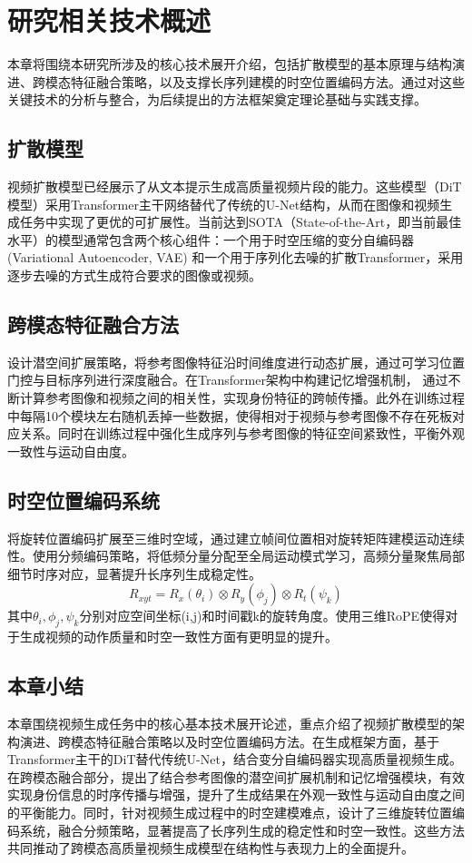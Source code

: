 \cleardoublepage

\section{研究相关技术概述}
本章将围绕本研究所涉及的核心技术展开介绍，包括扩散模型的基本原理与结构演进、跨模态特征融合策略，以及支撑长序列建模的时空位置编码方法。通过对这些关键技术的分析与整合，为后续提出的方法框架奠定理论基础与实践支撑。
\subsection{扩散模型}
视频扩散模型已经展示了从文本提示生成高质量视频片段的能力。这些模型（DiT模型）采用Transformer主干网络替代了传统的U-Net结构，从而在图像和视频生成任务中实现了更优的可扩展性。当前达到SOTA（State-of-the-Art，即当前最佳水平）的模型通常包含两个核心组件：一个用于时空压缩的变分自编码器 (Variational Autoencoder, VAE) 和一个用于序列化去噪的扩散Transformer，采用逐步去噪的方式生成符合要求的图像或视频。

\subsection{跨模态特征融合方法}
设计潜空间扩展策略，将参考图像特征沿时间维度进行动态扩展，通过可学习位置门控与目标序列进行深度融合。在Transformer架构中构建记忆增强机制， 通过不断计算参考图像和视频之间的相关性，实现身份特征的跨帧传播。此外在训练过程中每隔10个模块左右随机丢掉一些数据，使得相对于视频与参考图像不存在死板对应关系。同时在训练过程中强化生成序列与参考图像的特征空间紧致性，平衡外观一致性与运动自由度。

\subsection{时空位置编码系统}
将旋转位置编码扩展至三维时空域，通过建立帧间位置相对旋转矩阵建模运动连续性。使用分频编码策略，将低频分量分配至全局运动模式学习，高频分量聚焦局部细节时序对应，显著提升长序列生成稳定性。
\begin{equation}
R_{xyt} = R_x(\theta_i) \otimes R_y(\phi_j) \otimes R_t(\psi_k) 
\end{equation}
其中$\theta_i,\phi_j,\psi_k$分别对应空间坐标(i,j)和时间戳k的旋转角度。使用三维RoPE使得对于生成视频的动作质量和时空一致性方面有更明显的提升。

\subsection{本章小结}
本章围绕视频生成任务中的核心基本技术展开论述，重点介绍了视频扩散模型的架构演进、跨模态特征融合策略以及时空位置编码方法。在生成框架方面，基于Transformer主干的DiT替代传统U-Net，结合变分自编码器实现高质量视频生成。在跨模态融合部分，提出了结合参考图像的潜空间扩展机制和记忆增强模块，有效实现身份信息的时序传播与增强，提升了生成结果在外观一致性与运动自由度之间的平衡能力。同时，针对视频生成过程中的时空建模难点，设计了三维旋转位置编码系统，融合分频策略，显著提高了长序列生成的稳定性和时空一致性。这些方法共同推动了跨模态高质量视频生成模型在结构性与表现力上的全面提升。
